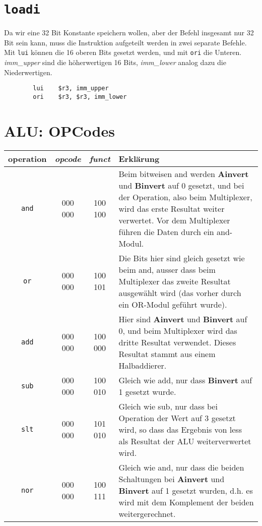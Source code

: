 \documentclass[a4paper,10pt,headlines=3.2]{scrartcl}
\begin{document}
\section{\texttt{loadi}}
Da wir eine 32 Bit Konstante speichern wollen, aber der Befehl insgesamt nur 32 Bit sein kann, muss die Instruktion aufgeteilt werden in zwei separate Befehle.
Mit \texttt{lui} können die 16 oberen Bits gesetzt werden, und mit \texttt{ori} die Unteren.\\
\textit{imm\_upper} sind die höherwertigen 16 Bits, \textit{imm\_lower} analog dazu die Niederwertigen.
\begin{verbatim}
        lui    $r3, imm_upper
        ori    $r3, $r3, imm_lower
\end{verbatim}

\section{ALU: OPCodes}
\begin{center}
\begin{tabular}{|c|c|c|p{8cm}|}\hline
\textbf{operation} & \textbf{\textit{opcode}} & \textbf{\textit{funct}} & \textbf{Erklärung}\\\hline
\texttt{and} & 000 000 & 100 100 & Beim bitweisen and werden \textbf{Ainvert} und \textbf{Binvert} auf 0 gesetzt, und bei der Operation, also beim Multiplexer, wird das erste Resultat weiter verwertet. Vor dem Multiplexer führen die Daten durch ein and-Modul.
\\\hline
\texttt{or} & 000 000 & 100 101 & Die Bits hier sind gleich gesetzt wie beim and, ausser dass beim Multiplexer das zweite Resultat ausgewählt wird (das vorher durch ein OR-Modul geführt wurde).\\\hline
\texttt{add} & 000 000 & 100 000 & Hier sind \textbf{Ainvert} und \textbf{Binvert} auf 0, und beim Multiplexer wird das dritte Resultat verwendet. Dieses Resultat stammt aus einem Halbaddierer.\\\hline
\texttt{sub} & 000 000 & 100 010 & Gleich wie add, nur dass \textbf{Binvert} auf 1 gesetzt wurde.\\\hline
\texttt{slt} & 000 000 & 101 010 & Gleich wie sub, nur dass bei Operation der Wert auf 3 gesetzt wird, so dass das Ergebnis von less als Resultat der ALU weiterverwertet wird.\\\hline
\texttt{nor} & 000 000 & 100 111 & Gleich wie and, nur dass die beiden Schaltungen bei \textbf{Ainvert} und \textbf{Binvert}  auf 1 gesetzt wurden, d.h. es wird mit dem Komplement der beiden weitergerechnet.\\\hline
\end{tabular}
\end{center}
\end{document}
